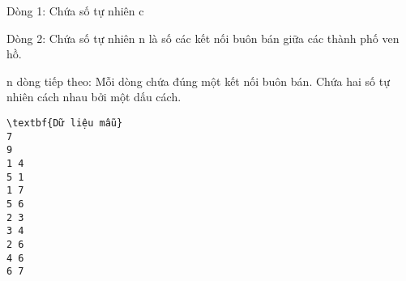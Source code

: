 Dòng 1: Chứa số tự nhiên c  

   Dòng  2:   Chứa số tự nhiên n là số các kết nối buôn bán giữa các thành phố ven hồ.  

   n dòng tiếp theo:   Mỗi dòng chứa đúng một kết nối buôn bán. Chứa hai số tự nhiên cách nhau bởi một dấu cách.  
\begin{verbatim}
\textbf{Dữ liệu mẫu}
7
9
1 4
5 1
1 7
5 6
2 3
3 4
2 6
4 6
6 7
\end{verbatim}